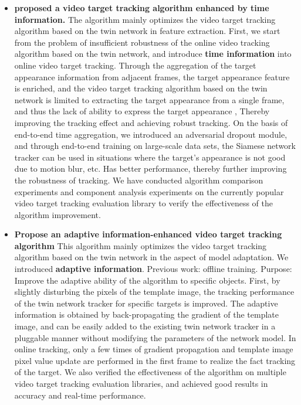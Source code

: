 \begin{itemize}
\item{\textbf{ proposed a video target tracking algorithm enhanced by time information. } The algorithm mainly optimizes the video target tracking algorithm based on the twin network in feature extraction. First, we start from the problem of insufficient robustness of the online video tracking algorithm based on the twin network, and introduce \textbf{time information} into online video target tracking. Through the aggregation of the target appearance information from adjacent frames, the target appearance feature is enriched, and the video target tracking algorithm based on the twin network is limited to extracting the target appearance from a single frame, and thus the lack of ability to express the target appearance , Thereby improving the tracking effect and achieving robust tracking. On the basis of end-to-end time aggregation, we introduced an adversarial dropout module, and through end-to-end training on large-scale data sets, the Siamese network tracker can be used in situations where the target's appearance is not good due to motion blur, etc. Has better performance, thereby further improving the robustness of tracking. We have conducted algorithm comparison experiments and component analysis experiments on the currently popular video target tracking evaluation library to verify the effectiveness of the algorithm improvement. }
\item{\textbf{Propose an adaptive information-enhanced video target tracking algorithm} This algorithm mainly optimizes the video target tracking algorithm based on the twin network in the aspect of model adaptation. We introduced \textbf{adaptive information}. Previous work: offline training. Purpose: Improve the adaptive ability of the algorithm to specific objects. First, by slightly disturbing the pixels of the template image, the tracking performance of the twin network tracker for specific targets is improved. The adaptive information is obtained by back-propagating the gradient of the template image, and can be easily added to the existing twin network tracker in a pluggable manner without modifying the parameters of the network model. In online tracking, only a few times of gradient propagation and template image pixel value update are performed in the first frame to realize the fact tracking of the target. We also verified the effectiveness of the algorithm on multiple video target tracking evaluation libraries, and achieved good results in accuracy and real-time performance. }

\end{itemize}
